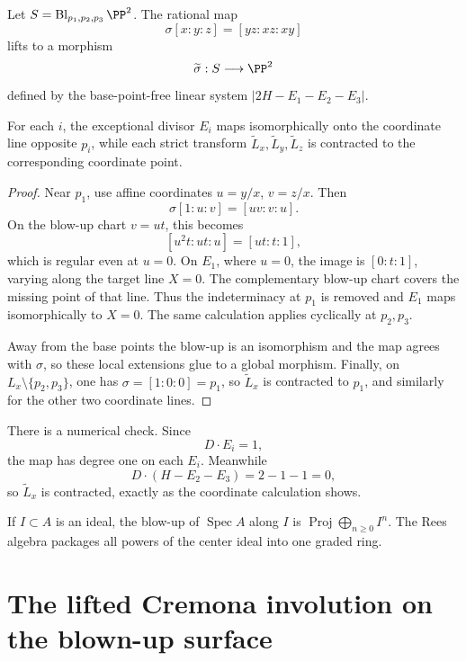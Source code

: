 \begin{theorem}\label{thm:vi45-resolve-cremona}
Let \(S=\Bl_{p_1,p_2,p_3}\PP^2\).  The rational map
\[
  \sigma[x:y:z]=[yz:xz:xy]
\]
lifts to a morphism
\[
  \widetilde\sigma:S\longrightarrow\PP^2
\]
defined by the base-point-free linear system \(|2H-E_1-E_2-E_3|\).

For each \(i\), the exceptional divisor \(E_i\) maps isomorphically onto the coordinate line opposite \(p_i\), while each strict transform \(\widetilde L_x,\widetilde L_y,\widetilde L_z\) is contracted to the corresponding coordinate point.
\end{theorem}

\begin{proof}
Near \(p_1\), use affine coordinates \(u=y/x\), \(v=z/x\).  Then
\[
  \sigma[1:u:v]=[uv:v:u].
\]
On the blow-up chart \(v=ut\), this becomes
\[
  [u^2t:ut:u]=[ut:t:1],
\]
which is regular even at \(u=0\).  On \(E_1\), where \(u=0\), the image is \([0:t:1]\), varying along the target line \(X=0\).  The complementary blow-up chart covers the missing point of that line.  Thus the indeterminacy at \(p_1\) is removed and \(E_1\) maps isomorphically to \(X=0\).  The same calculation applies cyclically at \(p_2,p_3\).

Away from the base points the blow-up is an isomorphism and the map agrees with \(\sigma\), so these local extensions glue to a global morphism.  Finally, on \(L_x\setminus\{p_2,p_3\}\), one has \(\sigma=[1:0:0]=p_1\), so \(\widetilde L_x\) is contracted to \(p_1\), and similarly for the other two coordinate lines.
\end{proof}

There is a numerical check.  Since
\[
  D\cdot E_i=1,
\]
the map has degree one on each \(E_i\).  Meanwhile
\[
  D\cdot(H-E_2-E_3)=2-1-1=0,
\]
so \(\widetilde L_x\) is contracted, exactly as the coordinate calculation shows.



\begin{example}\label{ex:vi45-expand-03}
If $I\subset A$ is an ideal, the blow-up of $\operatorname{Spec}A$ along $I$ is $\operatorname{Proj}\bigoplus_{n\ge0}I^n$.  The Rees algebra packages all powers of the center ideal into one graded ring.
\end{example}
\section{The lifted Cremona involution on the blown-up surface}


